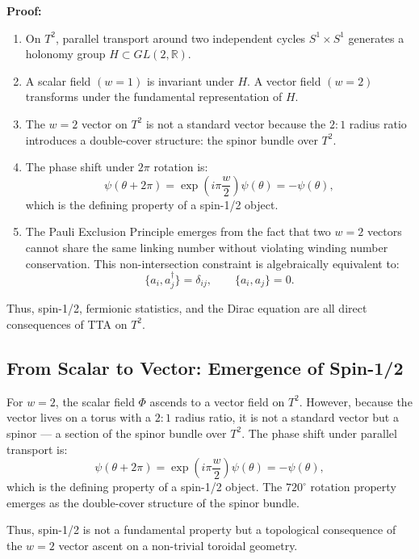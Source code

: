 \documentclass[11pt,a4paper]{article}
\begin{document}
\textbf{Proof:}
\begin{enumerate}
\item On \(T^2\), parallel transport around two independent cycles \(S^1 \times S^1\) generates a holonomy group \(H \subset GL(2, \mathbb{R})\).
\item A scalar field \((w = 1)\) is invariant under \(H\). A vector field \((w = 2)\) transforms under the fundamental representation of \(H\).
\item The \(w = 2\) vector on \(T^2\) is not a standard vector because the \(2:1\) radius ratio introduces a double-cover structure: the spinor bundle over \(T^2\).
\item The phase shift under \(2\pi\) rotation is:
\begin{equation}
\psi (\theta +2\pi) = \exp \left(i\pi \frac{w}{2}\right)\psi (\theta) = -\psi (\theta), \tag{25}
\end{equation}
which is the defining property of a spin-1/2 object.
\item The Pauli Exclusion Principle emerges from the fact that two \(w = 2\) vectors cannot share the same linking number without violating winding number conservation. This non-intersection constraint is algebraically equivalent to:
\begin{equation}
\{a_{i},a_{j}^{\dagger}\} = \delta_{ij},\qquad \{a_{i},a_{j}\} = 0. \tag{26}
\end{equation}
\end{enumerate}
Thus, spin-1/2, fermionic statistics, and the Dirac equation are all direct consequences of TTA on \(T^2\).

\subsection{From Scalar to Vector: Emergence of Spin-1/2}
For \(w = 2\), the scalar field \(\Phi\) ascends to a vector field on \(T^2\). However, because the vector lives on a torus with a \(2:1\) radius ratio, it is not a standard vector but a spinor — a section of the spinor bundle over \(T^2\). The phase shift under parallel transport is:
\begin{equation}
\psi (\theta +2\pi) = \exp \left(i\pi \frac{w}{2}\right)\psi (\theta) = -\psi (\theta), \tag{27}
\end{equation}
which is the defining property of a spin-1/2 object. The \(720^{\circ}\) rotation property emerges as the double-cover structure of the spinor bundle.

Thus, spin-1/2 is not a fundamental property but a topological consequence of the \(w = 2\) vector ascent on a non-trivial toroidal geometry.
\end{document}
